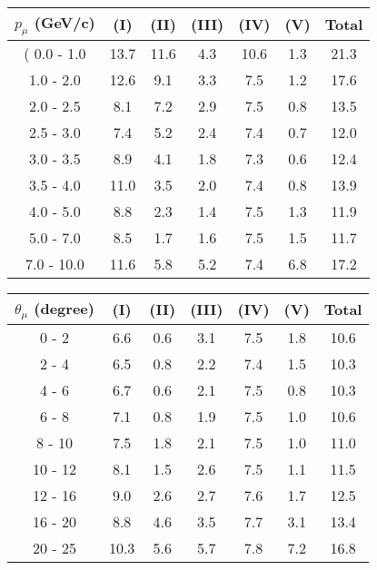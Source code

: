 \documentclass[aps, prd, reprint,showpacs,  preprintnumbers,amsmath,amssymb,superscriptaddress, nofootinbib]{revtex4-1}
\makeatletter
\renewenvironment{table}
  {\def\@captype{table}}
  {}
\makeatother
\begin{document}

\vspace{1cm}

\begin{table}
\centering
\begin{tabular}{ccccccc}
\hline
$p_{\mu}$ (GeV/c) & (I) & (II) & (III) & (IV) & (V) & Total \\
\hline (
 0.0 -  1.0 &  13.7 & 11.6  &  4.3  & 10.6  &  1.3  & 21.3 \\
 1.0 -  2.0 &  12.6 &  9.1  &  3.3  &  7.5  &  1.2  & 17.6 \\
 2.0 -  2.5 &   8.1 &  7.2  &  2.9  &  7.5  &  0.8  & 13.5 \\
 2.5 -  3.0 &   7.4 &  5.2  &  2.4  &  7.4  &  0.7  & 12.0 \\
 3.0 -  3.5 &   8.9 &  4.1  &  1.8  &  7.3  &  0.6  & 12.4 \\
 3.5 -  4.0 &  11.0 &  3.5  &  2.0  &  7.4  &  0.8  & 13.9 \\
 4.0 -  5.0 &   8.8 &  2.3  &  1.4  &  7.5  &  1.3  & 11.9 \\
 5.0 -  7.0 &   8.5 &  1.7  &  1.6  &  7.5  &  1.5  & 11.7 \\
 7.0 - 10.0 &  11.6 &  5.8  &  5.2  &  7.4  &  6.8  & 17.2 \\
\hline\hline
\end{tabular}
\caption{Fractional systematic uncertainties (in percent) on $d\sigma/dp_\mu$.}
\label{tb:pip_mup_err}
\end{table}

\vspace{1cm}

\begin{table}
\centering
\begin{tabular}{ccccccc}
\hline
$\theta_{\mu}$ (degree) & (I) & (II) & (III) & (IV) & (V) & Total \\
\hline
 0 -  2 &   6.6  &  0.6  &  3.1  &  7.5  &  1.8  & 10.6  \\
 2 -  4 &   6.5  &  0.8  &  2.2  &  7.4  &  1.5  & 10.3  \\
 4 -  6 &   6.7  &  0.6  &  2.1  &  7.5  &  0.8  & 10.3  \\
 6 -  8 &   7.1  &  0.8  &  1.9  &  7.5  &  1.0  & 10.6  \\
 8 - 10 &   7.5  &  1.8  &  2.1  &  7.5  &  1.0  & 11.0  \\
10 - 12 &   8.1  &  1.5  &  2.6  &  7.5  &  1.1  & 11.5  \\
12 - 16 &   9.0  &  2.6  &  2.7  &  7.6  &  1.7  & 12.5  \\
16 - 20 &   8.8  &  4.6  &  3.5  &  7.7  &  3.1  & 13.4  \\
20 - 25 &  10.3  &  5.6  &  5.7  &  7.8  &  7.2  & 16.8  \\
\hline\hline
\end{tabular}
\caption{Fractional systematic uncertainties (in percent) on $d\sigma/d\theta_\mu$.}
\label{tb:pip_muth_err}
\end{table}
\end{document}

